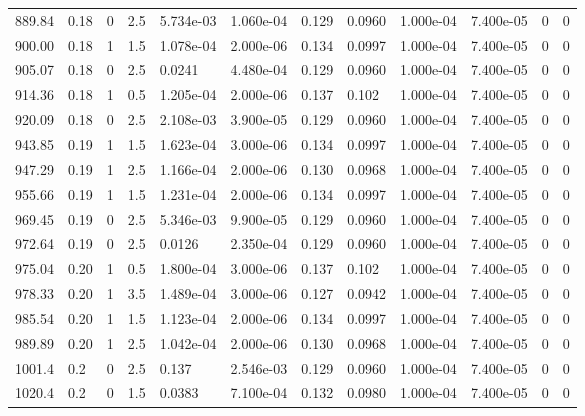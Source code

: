 \documentclass[preview]{standalone}
\begin{document}
{{{\begin{tabular}{L{1.2cm}C{1.2cm} C{0.3cm}C{0.5cm} C{1.4cm}C{1.4cm} C{1.4cm}C{1.4cm} C{1.6cm}C{1.6cm} C{1.6cm}C{1.6cm}}
  889.84  &  0.18  & 0     & 2.5 &  5.734e-03  & 1.060e-04  &  0.129&   0.0960& 1.000e-04 & 7.400e-05   &  0 & 0  \\ 
  900.00  &  0.18  & 1     & 1.5 &  1.078e-04  & 2.000e-06  &  0.134&   0.0997& 1.000e-04 & 7.400e-05   &  0 & 0  \\ 
  905.07  &  0.18  & 0     & 2.5 &  0.0241  & 4.480e-04  &  0.129&   0.0960& 1.000e-04 & 7.400e-05   &  0 & 0  \\ 
  914.36  &  0.18  & 1     & 0.5 &  1.205e-04  & 2.000e-06  &  0.137&   0.102& 1.000e-04 & 7.400e-05   &  0 & 0  \\ 
  920.09  &  0.18  & 0     & 2.5 &  2.108e-03  & 3.900e-05  &  0.129&   0.0960& 1.000e-04 & 7.400e-05   &  0 & 0  \\ 
  943.85  &  0.19  & 1     & 1.5 &  1.623e-04  & 3.000e-06  &  0.134&   0.0997& 1.000e-04 & 7.400e-05   &  0 & 0  \\ 
  947.29  &  0.19  & 1     & 2.5 &  1.166e-04  & 2.000e-06  &  0.130&   0.0968& 1.000e-04 & 7.400e-05   &  0 & 0  \\ 
  955.66  &  0.19  & 1     & 1.5 &  1.231e-04  & 2.000e-06  &  0.134&   0.0997& 1.000e-04 & 7.400e-05   &  0 & 0  \\ 
  969.45  &  0.19  & 0     & 2.5 &  5.346e-03  & 9.900e-05  &  0.129&   0.0960& 1.000e-04 & 7.400e-05   &  0 & 0  \\ 
  972.64  &  0.19  & 0     & 2.5 &  0.0126  & 2.350e-04  &  0.129&   0.0960& 1.000e-04 & 7.400e-05   &  0 & 0  \\ 
  975.04  &  0.20  & 1     & 0.5 &  1.800e-04  & 3.000e-06  &  0.137&   0.102& 1.000e-04 & 7.400e-05   &  0 & 0  \\ 
  978.33  &  0.20  & 1     & 3.5 &  1.489e-04  & 3.000e-06  &  0.127&   0.0942& 1.000e-04 & 7.400e-05   &  0 & 0  \\ 
  985.54  &  0.20  & 1     & 1.5 &  1.123e-04  & 2.000e-06  &  0.134&   0.0997& 1.000e-04 & 7.400e-05   &  0 & 0  \\ 
  989.89  &  0.20  & 1     & 2.5 &  1.042e-04  & 2.000e-06  &  0.130&   0.0968& 1.000e-04 & 7.400e-05   &  0 & 0  \\ 
  1001.4  &   0.2  & 0     & 2.5 &  0.137  & 2.546e-03  &  0.129&   0.0960& 1.000e-04 & 7.400e-05   &  0 & 0  \\ 
  1020.4  &   0.2  & 0     & 1.5 &  0.0383  & 7.100e-04  &  0.132&   0.0980& 1.000e-04 & 7.400e-05   &  0 & 0  \\ 
\hline 
\end{tabular} 

}}}
\end{document}
